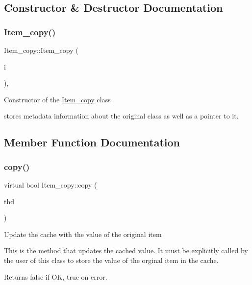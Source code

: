 \subsection{Constructor \& Destructor Documentation}
\mbox{\label{classItem__copy_af5168f3a1773e2cce8b34de3cec425b2}} 
\subsubsection{\texorpdfstring{Item\+\_\+copy()}{Item\_copy()}}
{\footnotesize\ttfamily Item\+\_\+copy\+::\+Item\+\_\+copy (\begin{DoxyParamCaption}\item[{\mbox{\hyperlink{classItem}{Item}} $\ast$}]{i }\end{DoxyParamCaption})\hspace{0.3cm}{\ttfamily [inline]}, {\ttfamily [protected]}}

Constructor of the \mbox{\hyperlink{classItem__copy}{Item\+\_\+copy}} class

stores metadata information about the original class as well as a pointer to it. 

\subsection{Member Function Documentation}
\mbox{\label{classItem__copy_a575caec22eeb27fb76d5aa74b1a8d492}} 
\subsubsection{\texorpdfstring{copy()}{copy()}}
{\footnotesize\ttfamily virtual bool Item\+\_\+copy\+::copy (\begin{DoxyParamCaption}\item[{const T\+HD $\ast$}]{thd }\end{DoxyParamCaption})\hspace{0.3cm}{\ttfamily [pure virtual]}}

Update the cache with the value of the original item

This is the method that updates the cached value. It must be explicitly called by the user of this class to store the value of the orginal item in the cache. \begin{DoxyReturn}{Returns}
false if OK, true on error. 
\end{DoxyReturn}


